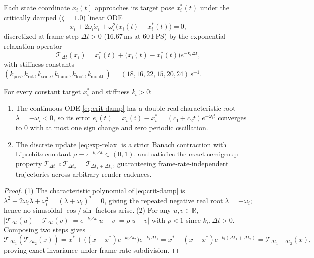 \begin{definition}
Each state coordinate $x_i(t)$ approaches its target pose $x_i^*(t)$ under the critically damped ($\zeta = 1.0$) linear ODE
\begin{equation}
\label{eq:crit-damp}
\ddot{x}_i + 2\omega_i\dot{x}_i + \omega_i^2\big(x_i(t) - x_i^*(t)\big) = 0,
\end{equation}
discretized at frame step $\Delta t > 0$ ($16.67\,\text{ms}$ at $60\,\text{FPS}$) by the exponential relaxation operator
\begin{equation}
\label{eq:exp-relax}
\mathcal{T}_{\Delta t}(x_i) = x_i^*(t) + \big(x_i(t) - x_i^*(t)\big)e^{-k_i \Delta t},
\end{equation}
with stiffness constants $(k_{\mathrm{pos}}, k_{\mathrm{rot}}, k_{\mathrm{scale}}, k_{\mathrm{hand}}, k_{\mathrm{foot}}, k_{\mathrm{mouth}}) = (18, 16, 22, 15, 20, 24)\,\text{s}^{-1}$.
\end{definition}

\begin{theorem}
\label{thm:kin-contract}
For every constant target $x_i^*$ and stiffness $k_i > 0$:
\begin{enumerate}[leftmargin=1.5em]
  \item The continuous ODE \eqref{eq:crit-damp} has a double real characteristic root $\lambda = -\omega_i < 0$, so its error $e_i(t) = x_i(t) - x_i^* = (c_1 + c_2 t)e^{-\omega_i t}$ converges to $0$ with at most one sign change and zero periodic oscillation.
  \item The discrete update \eqref{eq:exp-relax} is a strict Banach contraction with Lipschitz constant $\rho = e^{-k_i \Delta t} \in (0, 1)$, and satisfies the exact semigroup property $\mathcal{T}_{\Delta t_1} \circ \mathcal{T}_{\Delta t_2} = \mathcal{T}_{\Delta t_1 + \Delta t_2}$, guaranteeing frame-rate-independent trajectories across arbitrary render cadences.
\end{enumerate}
\end{theorem}

\begin{proof}
(1) The characteristic polynomial of \eqref{eq:crit-damp} is $\lambda^2 + 2\omega_i\lambda + \omega_i^2 = (\lambda + \omega_i)^2 = 0$, giving the repeated negative real root $\lambda = -\omega_i$; hence no sinusoidal $\cos/\sin$ factors arise.
(2) For any $u, v \in \mathbb{R}$, $|\mathcal{T}_{\Delta t}(u) - \mathcal{T}_{\Delta t}(v)| = e^{-k_i \Delta t}|u - v| = \rho |u - v|$ with $\rho < 1$ since $k_i, \Delta t > 0$. Composing two steps gives
\[
\mathcal{T}_{\Delta t_1}(\mathcal{T}_{\Delta t_2}(x)) = x^* + \big((x - x^*)e^{-k_i \Delta t_2}\big)e^{-k_i \Delta t_1} = x^* + (x - x^*)e^{-k_i(\Delta t_1 + \Delta t_2)} = \mathcal{T}_{\Delta t_1 + \Delta t_2}(x),
\]
proving exact invariance under frame-rate subdivision.
\end{proof}

